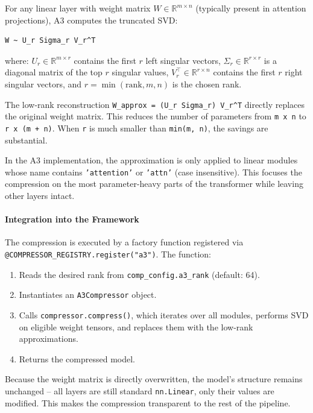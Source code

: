 For any linear layer with weight matrix $W \in \mathbb{R}^{m \times n}$ (typically present in attention projections), A3 computes the truncated SVD:

\vspace{0.5em}
\begin{mdframed}[backgroundcolor=codebg, linecolor=codeframe, linewidth=1pt, roundcorner=4pt, innerleftmargin=2pt, innerrightmargin=5pt, innertopmargin=5pt, innerbottommargin=5pt]
\begin{lstlisting}
W ~ U_r Sigma_r V_r^T
\end{lstlisting}
\end{mdframed}
\vspace{0.5em}

where:
$U_r \in \mathbb{R}^{m \times r}$ contains the first $r$ left singular vectors, $\Sigma_r \in \mathbb{R}^{r \times r}$ is a diagonal matrix of the top $r$ singular values, $V_r^\top \in \mathbb{R}^{r \times n}$ contains the first $r$ right singular vectors, and $r = \min(\text{rank}, m, n)$ is the chosen rank.


The low-rank reconstruction \texttt{W\_approx = (U\_r Sigma\_r) V\_r\textasciicircum{}T} directly replaces the original weight matrix. This reduces the number of parameters from \texttt{m x n} to \texttt{r x (m + n)}. When \texttt{r} is much smaller than \texttt{min(m, n)}, the savings are substantial.

In the A3 implementation, the approximation is only applied to linear modules whose name contains \texttt{'attention'} or \texttt{'attn'} (case insensitive). This focuses the compression on the most parameter-heavy parts of the transformer while leaving other layers intact.

\paragraph{Integration into the Framework}

The compression is executed by a factory function registered via \texttt{@COMPRESSOR\_REGISTRY.register("a3")}. The function:

\begin{enumerate}
\item Reads the desired rank from \texttt{comp\_config.a3\_rank} (default: 64).
\item Instantiates an \texttt{A3Compressor} object.
\item Calls \texttt{compressor.compress()}, which iterates over all modules, performs SVD on eligible weight tensors, and replaces them with the low-rank approximations.
\item Returns the compressed model.

\end{enumerate}
Because the weight matrix is directly overwritten, the model's structure remains unchanged -- all layers are still standard \texttt{nn.Linear}, only their values are modified. This makes the compression transparent to the rest of the pipeline.


